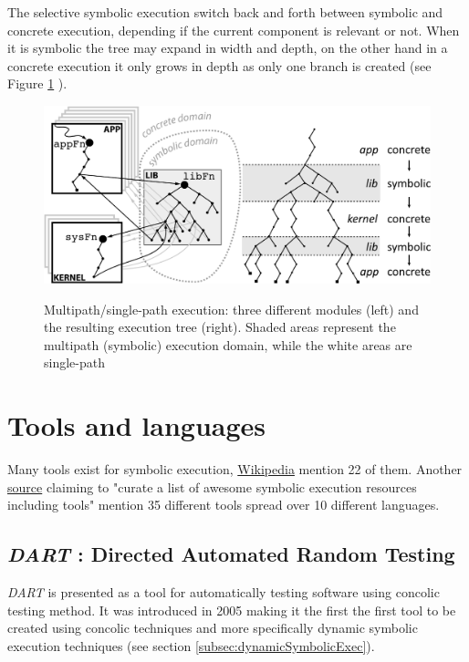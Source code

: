 \documentclass[11pt]{article}
\begin{document}
    		The selective symbolic execution switch back and forth between symbolic and concrete execution, depending if the current component is relevant or not. When it is symbolic the tree may expand in width and depth, on the other hand in a concrete execution it only grows in depth as only one branch is created (see Figure \ref{fig:selectiveSymbolicExample} ).
    		\begin{figure}
    			\centering
    			\includegraphics[scale=1.]{selectiveSymbolicExecExample.png}
    			\label{fig:selectiveSymbolicExample}
    			\caption{Multipath/single-path execution: three different modules (left) and the resulting execution tree (right). Shaded areas represent the multipath (symbolic) execution domain, while the white areas are single-path}
    		\end{figure}



  \section{Tools and languages}
  	Many tools exist for symbolic execution, \href{https://en.wikipedia.org/wiki/Symbolic_execution\#Tools}{Wikipedia} mention 22 of them. Another \href{https://github.com/ksluckow/awesome-symbolic-execution\#tools}{source} claiming to "curate a list of awesome symbolic execution resources including tools" mention 35 different tools spread over 10 different languages.\\ %



    \subsection{\emph{DART} : Directed Automated Random Testing}
    \label{subsec:DART}
    	\emph{DART} is presented as a tool for automatically testing software using concolic testing method. It was introduced in 2005 making it the first the first tool to be created using concolic techniques and more specifically dynamic symbolic execution techniques (see section \ref{subsec:dynamicSymbolicExec}). \\
\end{document}
